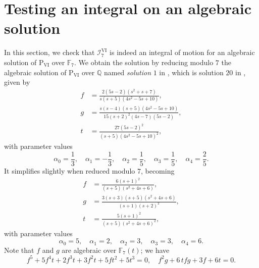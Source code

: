 \documentclass[a4paper,reqno]{amsart}
\numberwithin{equation}{section}
\numberwithin{figure}{section}
\theoremstyle{remark}
\newcommand\Psix{\textrm{P}_{\textrm{VI}}}
\begin{document}
\section{Testing an integral on an algebraic solution}\label{sec:algebraic}
In this section, we check that $\mathcal{I}_7^\textrm{VI}$ is indeed an integral of motion for an algebraic solution of $\Psix$ over $\mathbb{F}_7$. We obtain the solution by reducing modulo $7$ the algebraic solution of $\Psix$ over $\mathbb{Q}$ named \textit{solution} $1$ in \cite{lisovyyalgebraic}, which is solution $20$ in \cite{boalchico}, given by
\begin{align*}
    f&=\frac{2(5s-2)(s^2+s+7)}{s(s+5)(4s^2-5s+10)},\\
    g&=\frac{s(s-4)(s+5)(4s^2-5s+10)}{15(s+2)^2(4s-7)(5s-2)},\\
    t&=\frac{27(5s-2)^2}{(s+5)(4s^2-5s+10)^2},
\end{align*}
with parameter values
\begin{equation*}
    \alpha_0=\frac{1}{3},\quad \alpha_1=-\frac{1}{3},\quad \alpha_2=\frac{1}{5},\quad \alpha_3=\frac{1}{5},\quad \alpha_4=\frac{2}{5}. 
\end{equation*}
It simplifies slightly when reduced modulo $7$, becoming
\begin{equation}\label{eq:algsolred7}
\begin{aligned}
    f&=\frac{6(s+1)^2}{(s+5)(s^2+4s+6)},\\
    g&=\frac{3(s+3)(s+5)(s^2+4s+6)}{(s+1)(s+2)^2},\\
    t&=\frac{5(s+1)^2}{(s+5)(s^2+4s+6)^2},
\end{aligned}
\end{equation}
with parameter values
\begin{equation}\label{eq:paramalg}
    \alpha_0=5,\quad \alpha_1=2,\quad \alpha_2=3,\quad \alpha_3=3,\quad \alpha_4=6. 
\end{equation}
Note that $f$ and $g$ are algebraic over $\mathbb{F}_7(t)$; we have
\begin{equation}\label{eq:algebraicimplicit}
f^5+5 f^4 t+2 f^3 t+3 f^2 t+5 f t^2+5 t^3=0,\quad f^2 g+6\, t f g+3 f+6 t=0.
\end{equation}
\end{document}
